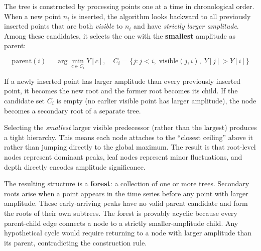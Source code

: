 \documentclass[a4paper,12pt]{article}
\begin{document}
The tree is constructed by processing points one at a time in chronological order. When a new point $n_i$ is inserted, the algorithm looks backward to all previously inserted points that are both \emph{visible} to $n_i$ and have \emph{strictly larger amplitude}. Among these candidates, it selects the one with the \textbf{smallest} amplitude as parent:

\begin{equation}
\text{parent}(i) = \arg\min_{c \in C_i} Y[c], \quad C_i = \{j : j < i,\; \text{visible}(j, i),\; Y[j] > Y[i]\}
\label{eq:parent-assignment}
\end{equation}

If a newly inserted point has larger amplitude than every previously inserted point, it becomes the new root and the former root becomes its child. If the candidate set $C_i$ is empty (no earlier visible point has larger amplitude), the node becomes a secondary root of a separate tree.

Selecting the \emph{smallest} larger visible predecessor (rather than the largest) produces a tight hierarchy. This means each node attaches to the ``closest ceiling'' above it rather than jumping directly to the global maximum. The result is that root-level nodes represent dominant peaks, leaf nodes represent minor fluctuations, and depth directly encodes amplitude significance.

The resulting structure is a \textbf{forest}: a collection of one or more trees. Secondary roots arise when a point appears in the time series before any point with larger amplitude. These early-arriving peaks have no valid parent candidate and form the roots of their own subtrees. The forest is provably acyclic because every parent-child edge connects a node to a strictly smaller-amplitude child. Any hypothetical cycle would require returning to a node with larger amplitude than its parent, contradicting the construction rule.
\end{document}
